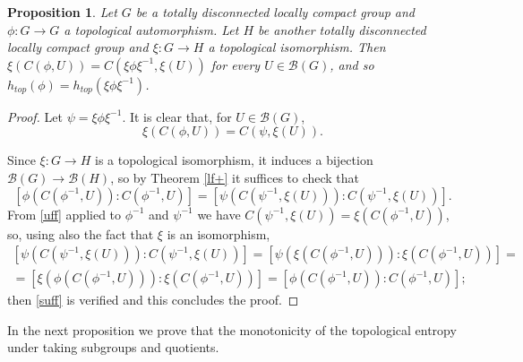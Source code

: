 \documentclass[11pt]{article}
\newtheorem{proposition}[theorem]{Proposition}
\newtheorem{lemma}[theorem]{Lemma}
\theoremstyle{definition}
\numberwithin{equation}{section}
\begin{document}
\begin{proposition}\label{conj}
Let $G$ be a totally disconnected locally compact group and $\phi:G\to G$ a topological automorphism. Let $H$ be another totally disconnected locally compact group and $\xi:G\to H$ a topological isomorphism. Then $\xi(C(\phi,U))=C(\xi\phi\xi^{-1},\xi(U))$ for every $U\in\mathcal B(G)$, and so $h_{top}(\phi)=h_{top}(\xi\phi\xi^{-1})$.
\end{proposition}
\begin{proof}
Let $\psi=\xi\phi\xi^{-1}$. It is clear that, for $U\in\mathcal B(G)$,
\begin{equation}\label{uff}
\xi(C(\phi,U))=C(\psi,\xi(U)).
\end{equation}

Since $\xi:G\to H$ is a topological isomorphism, it induces a bijection $\mathcal B(G)\to \mathcal B(H)$, so by Theorem \ref{lf+} it suffices to check that 
\begin{equation}\label{suff}
[\phi(C(\phi^{-1},U)):C(\phi^{-1},U)]=[\psi(C(\psi^{-1},\xi(U))):C(\psi^{-1},\xi(U))].
\end{equation}
From \eqref{uff} applied to $\phi^{-1}$ and $\psi^{-1}$ we have $C(\psi^{-1},\xi(U))=\xi(C(\phi^{-1},U))$, so, using also the fact that $\xi$ is an isomorphism,
\begin{equation*}\begin{split}
[\psi(C(\psi^{-1},\xi(U))):C(\psi^{-1},\xi(U))]=[\psi(\xi(C(\phi^{-1},U))):\xi(C(\phi^{-1},U))]=\\
=[\xi(\phi(C(\phi^{-1},U))):\xi(C(\phi^{-1},U))]=[\phi(C(\phi^{-1},U)):C(\phi^{-1},U)];
\end{split}\end{equation*}
then \eqref{suff} is verified and this concludes the proof.
\end{proof}

In the next proposition we prove that the monotonicity of the topological entropy under taking subgroups and quotients.

\end{document}
